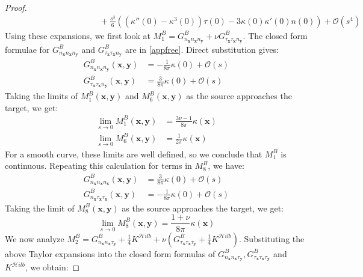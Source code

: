 \documentclass[preprint,12pt,3p]{elsarticle}
\begin{document}
\begin{proof}
\begin{align}
         &\qquad\qquad\qquad\qquad\qquad + \frac{s^3}{6} ((\kappa''(0) - \kappa^3(0))\tau(0)-3\kappa(0) \kappa'(0) n(0)) + \mathcal{O}(s^4) \label{nseries}
    \end{align}
    Using these expansions, we first look at $M_{1}^{B} =  G^{B}_{n_\mathbf{x} n_\mathbf{x} n_\mathbf{y}} + \nu G^{B}_{\tau_\mathbf{x} \tau_\mathbf{x} n_\mathbf{y}} $. The closed form formulae for $G^{B}_{n_\mathbf{x} n_\mathbf{x} n_\mathbf{y}}$ and $G^{B}_{\tau_\mathbf{x} \tau_\mathbf{x} n_\mathbf{y}}$ are in \ref{appfree}. Direct substitution gives: 
    \begin{align}
        G^{B}_{n_\mathbf{x} n_\mathbf{x} n_\mathbf{y}}(\mathbf{x},\mathbf{y}) &= - \frac{1}{8\pi}\kappa(0) + \mathcal{O}(s)\\
        G^{B}_{\tau_\mathbf{x} \tau_\mathbf{x} n_\mathbf{y}} (\mathbf{x},\mathbf{y}) &= \frac{3}{8\pi}\kappa(0) + \mathcal{O}(s)
    \end{align}
    Taking the limits of $M^B_1(\mathbf{x},\mathbf{y})$ and $M^B_6(\mathbf{x},\mathbf{y})$ as the source approaches the target, we get:
    \begin{align}
        \lim_{s \to 0} M^B_{1}(\mathbf{x},\mathbf{y})  &=  \frac{3\nu -1}{8\pi} \kappa(\mathbf{x}) \\
        \lim_{s \to 0} M^B_{6}(\mathbf{x},\mathbf{y})  &=  \frac{1}{2\pi} \kappa(\mathbf{x})
    \end{align}
    For a smooth curve, these limits are well defined, so we conclude that $M^{B}_{1}$ is continuous. Repeating this calculation for terms in $M_{8}^{B}$, we have: 
    \begin{align}
        G^{B}_{n_\mathbf{x} n_\mathbf{x} n_\mathbf{x}}(\mathbf{x},\mathbf{y}) &= \frac{3}{8 \pi}\kappa(0) + \mathcal{O}(s)\\
        G^{B}_{n_\mathbf{x} \tau_\mathbf{x} \tau_\mathbf{x}} (\mathbf{x},\mathbf{y}) &= - \frac{1}{8 \pi} \kappa(0) + \mathcal{O}(s)
    \end{align}
    Taking the limit of $M^B_8(\mathbf{x},\mathbf{y})$ as the source approaches the target, we get:
    \begin{equation}
        \lim_{s \to 0} M^B_{8}(\mathbf{x},\mathbf{y})  =  \frac{1 + \nu}{8\pi} \kappa(\mathbf{x})
    \end{equation}
    We now analyze $M_{2}^{B} =G^{B}_{n_\mathbf{x} n_\mathbf{x} \tau_\mathbf{y}}  + \frac{1}{4}K^{\mathcal{H}ilb} +   \nu (G^{B}_{\tau_\mathbf{x} \tau_\mathbf{x} \tau_\mathbf{y}} + \frac{1}{4}K^{\mathcal{H}ilb}) $. Substituting the above Taylor expansions into the closed form formulas of $G^{B}_{n_\mathbf{x} n_\mathbf{x} \tau_\mathbf{y}} , G^{B}_{\tau_\mathbf{x} \tau_\mathbf{x} \tau_\mathbf{y}}$ and $K^{\mathcal{H}ilb}$, we obtain: 

\end{proof}
\end{document}
